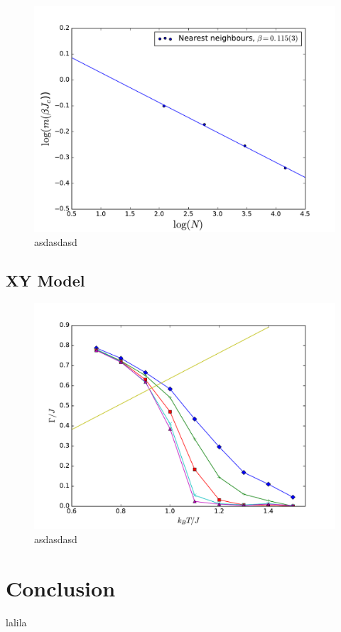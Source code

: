 \documentclass[twoside]{article}
\begin{document}
\begin{multicols}{2}
\begin{figure}[H]
\centering
\includegraphics[scale=0.4]{images/plot_magnetization.pdf}
\caption{asdasdasd}
\end{figure}

\subsection{XY Model}
\begin{figure}[H]
\centering
\includegraphics[scale=0.4]{images/helicity_modulus.pdf}
\caption{asdasdasd}
\end{figure}

\section{Conclusion}
lalila


\end{multicols}
\end{document}
